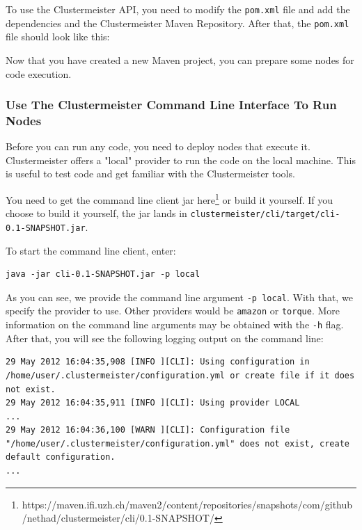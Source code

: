 \documentclass{article}
\begin{document}
To use the Clustermeister API, you need to modify the \texttt{pom.xml} file and add the dependencies and the Clustermeister Maven Repository. After that, the \texttt{pom.xml} file should look like this:



Now that you have created a new Maven project, you can prepare some nodes for code execution.

\subsubsection{Use The Clustermeister Command Line Interface To Run Nodes}

Before you can run any code, you need to deploy nodes that execute it. Clustermeister offers a "local" provider to run the code on the local machine. This is useful to test code and get familiar with the Clustermeister tools.

You need to get the command line client jar here\footnote{https://maven.ifi.uzh.ch/maven2/content/repositories/snapshots/com/github/nethad/clustermeister/cli/0.1-SNAPSHOT/} or build it yourself. If you choose to build it yourself, the jar lands in \texttt{clustermeister/cli/target/cli-0.1-SNAPSHOT.jar}.

To start the command line client, enter:

\begin{lstlisting}[breaklines=true, backgroundcolor=\color{lbcolor}]
java -jar cli-0.1-SNAPSHOT.jar -p local 
\end{lstlisting}

As you can see, we provide the command line argument \texttt{-p local}. With that, we specify the provider to use. Other providers would be \texttt{amazon} or \texttt{torque}. More information on the command line arguments may be obtained with the \texttt{-h} flag. After that, you will see the following logging output on the command line:

\begin{lstlisting}[breaklines=true, backgroundcolor=\color{lbcolor}]
29 May 2012 16:04:35,908 [INFO ][CLI]: Using configuration in /home/user/.clustermeister/configuration.yml or create file if it does not exist.
29 May 2012 16:04:35,911 [INFO ][CLI]: Using provider LOCAL
...
29 May 2012 16:04:36,100 [WARN ][CLI]: Configuration file "/home/user/.clustermeister/configuration.yml" does not exist, create default configuration.
... 
\end{lstlisting}
\end{document}
